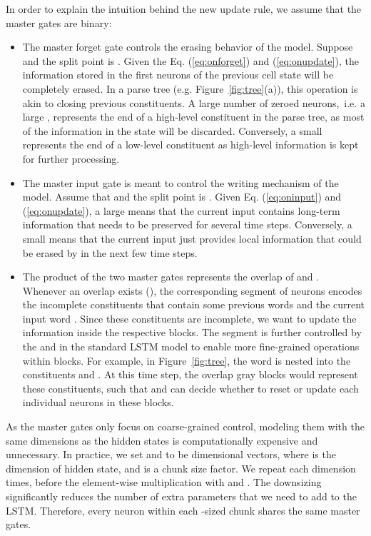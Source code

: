 \documentclass{article} \usepackage{iclr2019_conference,times}
\begin{document}
In order to explain the intuition behind the new update rule, we assume that the master gates are binary:
\begin{itemize}
    \item The master forget gate  controls the erasing behavior of the model. Suppose  and the split point is . Given the Eq. (\ref{eq:onforget}) and (\ref{eq:onupdate}), the information stored in the first  neurons of the previous cell state  will be completely erased.
In a parse tree (e.g. Figure~\ref{fig:tree}(a)), this operation is akin to closing previous constituents.
    A large number of zeroed neurons,~i.e. a large , represents the end of a high-level constituent in the parse tree, as most of the information in the state will be discarded. Conversely, a small  represents the end of a low-level constituent as high-level information is kept for further processing.
    
    \item The master input gate  is meant to control the writing mechanism of the model. 
    Assume that  and the split point is . 
    Given Eq. (\ref{eq:oninput}) and (\ref{eq:onupdate}), a large  means that the current input  contains long-term information that needs to be preserved for several time steps.
    Conversely, a small  means that the current input  just provides local information that could be erased by  in the next few time steps.
    
    \item The product of the two master gates  represents the overlap of  and .
    Whenever an overlap exists (), the corresponding segment of neurons encodes the incomplete constituents that contain some previous words and the current input word .
    Since these constituents are incomplete, we want to update the information inside the respective blocks. 
    The segment is further controlled by the  and  in the standard LSTM model to enable more fine-grained operations within blocks.
    For example, in Figure~\ref{fig:tree}, the word  is nested into the constituents  and . At this time step, the overlap gray blocks would represent these constituents, such that  and  can decide whether to reset or update each individual neurons in these blocks.
\end{itemize}







As the master gates only focus on coarse-grained control, modeling them with the same dimensions as the hidden states is computationally expensive and unnecessary.
In practice, we set  and  to be  dimensional vectors, where  is the dimension of hidden state, and  is a chunk size factor.
We repeat each dimension  times, before the element-wise multiplication with  and . The downsizing significantly reduces the number of extra parameters that we need to add to the LSTM. 
Therefore, every neuron within each -sized chunk shares the same master gates.
\end{document}
